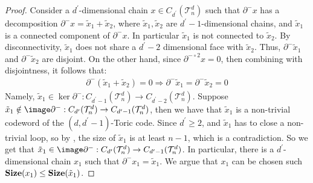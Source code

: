 \begin{proof}
  Consider a $d^{\prime}$-dimensional chain $x \in C_{d^{\prime}}(\mathcal{T}_n^d)$ such that $\partial^{-} x$ has a decomposition $\partial^{-}x = \tilde{x}_{1} + \tilde{x}_{2}$, where $\tilde{x}_{1}, \tilde{x}_{2}$ are $d^{\prime}-1$-dimensional chains, and $\tilde{x}_{1}$ is a connected component of $\partial^{-}x$. In particular $\tilde{x}_{1}$ is not connected to $\tilde{x}_{2}$. By disconnectivity, $\tilde{x}_{1}$ does not share a $d^{\prime}-2$ dimensional face with $\tilde{x}_{2}$. Thus, $\partial^{-} \tilde{x}_{1}$ and $\partial^{-} \tilde{x}_{2}$ are disjoint. On the other hand, since $\partial^{- \circ 2} x = 0$, then combining with disjointness, it follows that:
  \begin{equation*}
    \begin{split}
      \partial^{-}( \tilde{x}_{1} + \tilde{x}_{2} ) = 0 \Rightarrow \partial^{-} \tilde{x}_{1} = \partial^{-}\tilde{x}_{2} = 0 
    \end{split}
  \end{equation*}  Namely, $\tilde{x}_{1} \in \ker \partial^{-} : C_{d^{\prime}-1}(\mathcal{T}_n^d) \rightarrow C_{d^{\prime}-2}(\mathcal{T}_n^d)$.
Suppose $\tilde{x}_{1} \notin \image \partial^{-} : C_{d^{\prime}}(\mathcal{T}_n^d) \rightarrow C_{d^{\prime}-1}(\mathcal{T}_n^d)$, then we have that $\tilde{x}_{1}$ is a non-trivial codeword of the $(d,d^{\prime}-1)$-Toric code. 
Since $d^{\prime} \ge 2$, and $\tilde{x}_{1}$ has to close a non-trivial loop, so by , the size of $\tilde{x}_{1}$ is at least $n-1$, which is a contradiction. So we get that $\tilde{x}_{1}\in \image \partial^{-} : C_{d^{\prime}}(\mathcal{T}_n^d) \rightarrow C_{d^{\prime}-1}(\mathcal{T}_n^d)$. In particular, there is a $d^{\prime}$-dimensional chain $x_{1}$ such that $\partial^{-}x_{1} = \tilde{x}_{1}$. We argue that $x_{1}$ can be chosen such $\mathbf{Size}(x_{1}) \le \mathbf{Size}(\tilde{x}_{1})$.



\end{proof}

